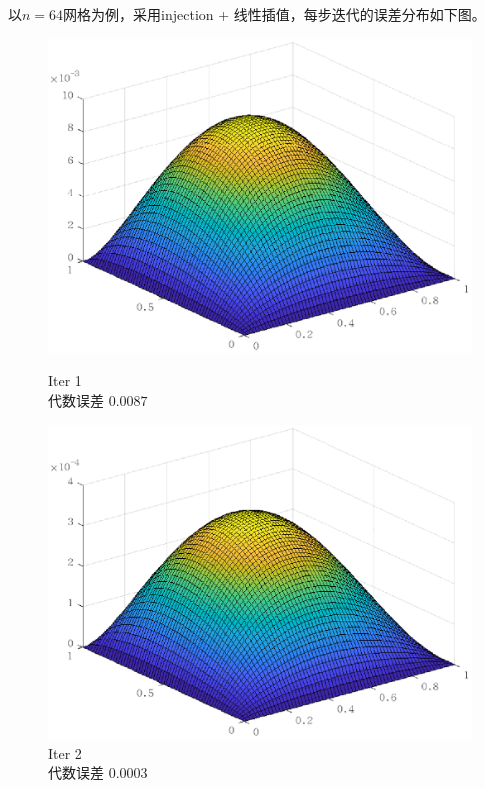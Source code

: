 \documentclass[lang=cn,10pt]{elegantbook}
\begin{document}
以$n=64$网格为例，采用injection + 线性插值，每步迭代的误差分布如下图。
\begin{figure}[H]
  \centering
  \begin{minipage}[t]{0.22\linewidth}
      \centering
      \includegraphics[width=0.84\linewidth]{figure/2-5-1.eps}
      \caption*{\small Iter 1 \\ 代数误差 $0.0087$}
  \end{minipage}
  \hspace{1em}
  \begin{minipage}[t]{0.22\linewidth}
    \centering
    \includegraphics[width=0.84\linewidth]{figure/2-5-2.eps}
    \caption*{\small Iter 2 \\ 代数误差 $0.0003$}
  \end{minipage}
  \hspace{1em}
  \begin{minipage}[t]{0.22\linewidth}
    \centering

\end{minipage}
\end{figure}
\end{document}
